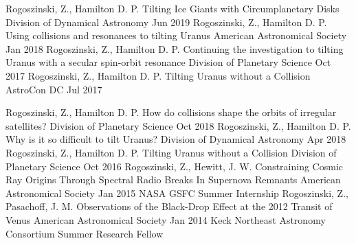 \documentclass[]{awesome-cv}
\begin{document}
\begin{cventries}
	\cventry
	{Rogoszinski, Z., Hamilton D. P.}
	{Tilting Ice Giants with Circumplanetary Disks}
	{Division of Dynamical Astronomy}
	{Jun 2019}
	{}
	\cventry
	{Rogoszinski, Z., Hamilton D. P.}
	{Using collisions and resonances to tilting Uranus}
	{American Astronomical Society }
	{Jan 2018}
	{}
	\cventry
	{Rogoszinski, Z., Hamilton D. P.}
	{Continuing the investigation to tilting Uranus with a secular spin-orbit resonance}
	{Division of Planetary Science }
	{Oct 2017}
	{}
	\cventry
	{Rogoszinski, Z., Hamilton D. P.}
	{Tilting Uranus without a Collision}
	{AstroCon DC }
	{Jul 2017}
	{}	
	
	\vspace{-6mm}
\end{cventries}
\begin{cventries}
	\cventry
	{Rogoszinski, Z., Hamilton D. P.}
	{How do collisions shape the orbits of irregular satellites?}
	{Division of Planetary Science}
	{Oct 2018}
	{}
	\cventry
	{Rogoszinski, Z., Hamilton D. P.}
	{Why is it so difficult to tilt Uranus?}
	{Division of Dynamical Astronomy}
	{Apr 2018}
	{}
	\cventry
	{Rogoszinski, Z., Hamilton D. P.}
	{Tilting Uranus without a Collision}
	{Division of Planetary Science}
	{Oct 2016}
	{}
	\cventry
	{Rogoszinski, Z., Hewitt, J. W.}
	{Constraining Cosmic Ray Origins Through Spectral Radio Breaks In Supernova Remnants }
	{American Astronomical Society}
	{Jan 2015}
	{NASA GSFC Summer Internship}
	\cventry
	{Rogoszinski, Z., Pasachoff, J. M.}
	{Observations of the Black-Drop Effect at the 2012 Transit of Venus }
	{American Astronomical Society}
	{Jan 2014}
	{Keck Northeast Astronomy Consortium Summer Research Fellow}
	
	\vspace{-3mm}
\end{cventries}
\end{document}
